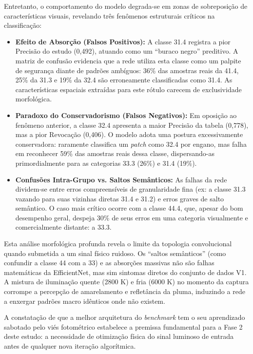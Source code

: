 Entretanto, o comportamento do modelo degrada-se em zonas de sobreposição de características visuais, revelando três fenômenos estruturais críticos na classificação:

\begin{itemize}
    \item \textbf{Efeito de Absorção (Falsos Positivos):} A classe 31.4 registra a pior Precisão do estudo (0,492), atuando como um ``buraco negro'' preditivo. A matriz de confusão evidencia que a rede utiliza esta classe como um palpite de segurança diante de padrões ambíguos: 36\% das amostras reais da 41.4, 25\% da 31.3 e 19\% da 32.4 são erroneamente classificadas como 31.4. As características espaciais extraídas para este rótulo carecem de exclusividade morfológica.
    
    \item \textbf{Paradoxo do Conservadorismo (Falsos Negativos):} Em oposição ao fenômeno anterior, a classe 32.4 apresenta a maior Precisão da tabela (0,778), mas a pior Revocação (0,406). O modelo adota uma postura excessivamente conservadora: raramente classifica um \textit{patch} como 32.4 por engano, mas falha em reconhecer 59\% das amostras reais dessa classe, dispersando-as primordialmente para as categorias 33.3 (26\%) e 31.4 (19\%).
    
    \item \textbf{Confusões Intra-Grupo vs. Saltos Semânticos:} As falhas da rede dividem-se entre erros compreensíveis de granularidade fina (ex: a classe 31.3 vazando para suas vizinhas diretas 31.4 e 31.2) e erros graves de salto semântico. O caso mais crítico ocorre com a classe 44.4, que, apesar do bom desempenho geral, despeja 30\% de seus erros em uma categoria visualmente e comercialmente distante: a 33.3.
\end{itemize}

Esta análise morfológica profunda revela o limite da topologia convolucional quando submetida a um sinal físico ruidoso. Os ``saltos semânticos'' (como confundir a classe 44 com a 33) e as absorções massivas não são falhas matemáticas da EfficientNet, mas sim sintomas diretos do conjunto de dados V1. A mistura de iluminação quente (2800 K) e fria (6000 K) no momento da captura corrompe a percepção de amarelamento e refletância da pluma, induzindo a rede a enxergar padrões macro idênticos onde não existem. 

A constatação de que a melhor arquitetura do \textit{benchmark} tem o seu aprendizado sabotado pelo viés fotométrico estabelece a premissa fundamental para a Fase 2 deste estudo: a necessidade de otimização física do sinal luminoso de entrada antes de qualquer nova iteração algorítmica.

